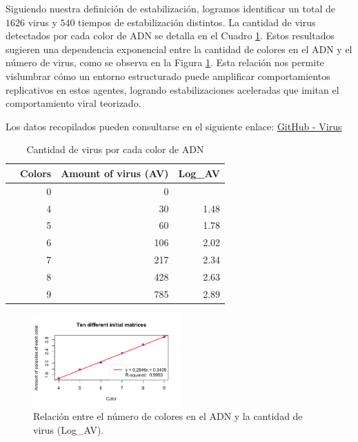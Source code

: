 \documentclass[twocolumn]{article}
\begin{document}
Siguiendo nuestra definición de estabilización, logramos identificar un total de $1626$ virus y $540$ tiempos de estabilización distintos. La cantidad de virus detectados por cada color de ADN se detalla en el Cuadro \ref{tab:TB1}. Estos resultados sugieren una dependencia exponencial entre la cantidad de colores en el ADN y el número de virus, como se observa en la Figura \ref{fig:SLP}. Esta relación nos permite vislumbrar cómo un entorno estructurado puede amplificar comportamientos replicativos en estos agentes, logrando estabilizaciones aceleradas que imitan el comportamiento viral teorizado.

Los datos recopilados pueden consultarse en el siguiente enlace: 
\href{https://github.com/almuoz90/hormiga1/tree/e0f04899c7bebcd6a5a330093a3246662f58e2a8/Parasitos}{GitHub - Virus}

\begin{table}[h!]
\centering
\resizebox{8cm}{!} {
\begin{tabular}{rr|r|r}
  \hline
 & \textbf{Colors} & \textbf{Amount of virus (AV)} & \textbf{Log\_AV} \\ 
  \hline
& 0 & 0 &  \\ 
& 4 & 30 & 1.48 \\ 
& 5 & 60 & 1.78 \\ 
& 6 & 106 & 2.02 \\ 
& 7 & 217 & 2.34 \\ 
& 8 & 428 & 2.63 \\ 
& 9 & 785 & 2.89 \\ 
   \hline
\end{tabular}
}
 \caption{Cantidad de virus por cada color de ADN}
  \label{tab:TB1}
\end{table}

 \begin{figure}[h!]
        \includegraphics[width=0.5\textwidth]{reportTemplate/figures/SWPL.png}
  \caption{Relación entre el número de colores en el ADN y la cantidad de virus (Log\_AV).}
  \label{fig:SLP}
\end{figure}
\end{document}
